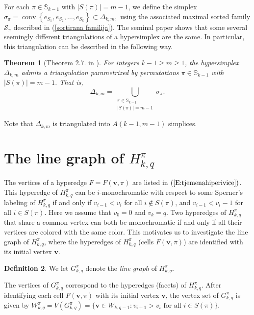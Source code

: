 \documentclass{birkjour}
\newtheorem{thm}{Theorem}[section]
\theoremstyle{definition}
\newtheorem{defn}[thm]{Definition}
\theoremstyle{remark}
\numberwithin{equation}{section}
\begin{document}
\noindent For each $\pi\in\mathbb S_{k-1}$ with $|S(\pi)|=m-1$, we
define the simplex
$\sigma_\pi=\operatorname{conv}\left\{e_{S_1},e_{S_2},\ldots,e_{S_k}\right\}\subset
\Delta_{k,m},$ using the associated maximal sorted family
 $\mathcal{S}_\pi$ described in (\ref{sortirana familija}).
 The seminal paper
\cite{Lam} shows that some several seemingly different
triangulations of a hypersimplex are the same. In particular, this
triangulation can be described in the following way.
\begin{thm}[Theorem 2.7. in \cite{Lam}]\label{T:triangulationofHip}
For integers $k-1\geq m\geq 1$, the hypersimplex $\Delta_{k,m}$
admits a triangulation
  parametrized by
  permutations $\pi \in \mathbb{S}_{k-1}$ with $|S(\pi)| = m - 1$.
That is,
$$\Delta_{k,m}=\bigcup_{\substack{\pi\in
\mathbb{S}_{k-1}\\|S(\pi)|=m-1}}\sigma_\pi.$$
\end{thm}

Note that $\Delta_{k,m}$ is triangulated into $A(k-1,m-1)$
simplices.






\section{The line graph of $H^\pi_{k,q}$}

The vertices of a hyperedge $F=F(\mathbf{v},\pi)$ are listed in
$(\ref{E:tjemenahiperivice})$. This hyperedge of $H_{k,q}^\pi$ can
be $i$-monochromatic with respect to some Sperner's labeling of
$H_{k,q}^\pi$ if and only if $v_{i-1}<v_{i}$ for all $i\notin
S(\pi)$, and $v_{i-1}<v_{i}-1$ for all $i\in S(\pi)$. Here we
assume that $v_0=0$ and $v_k=q$. Two hyperedges of $H^\pi_{k,q}$
that share a common vertex can both be monochromatic if and only
if all their vertices are colored with the same color. This
motivates us to investigate the line graph of $H^\pi_{k,q}$, where
the hyperedges of $H^\pi_{k,q}$ (cells $F(\mathbf v,\pi)$)
 are identified with its initial vertex $\mathbf{v}$.

\begin{defn}
We let $G^{\pi}_{k,q}$ denote the \emph{line graph} of
$H^\pi_{k,q}$.
\end{defn}

The vertices of $G^{\pi}_{k,q}$ correspond to the hyperedges
(facets) of $H^\pi_{k,q}$. After identifying each cell
$F(\mathbf{v},\pi)$ with its initial vertex $\mathbf{v}$, the
vertex set of $G^{\pi}_{k,q}$ is given by
$W^\pi_{k,q}=V(G^{\pi}_{k,q})= \big\{\mathbf{v}\in
W_{k,q-1}:v_{i+1}>v_i \textrm{ for all }i\in S(\pi)\big\}.$
\end{document}
